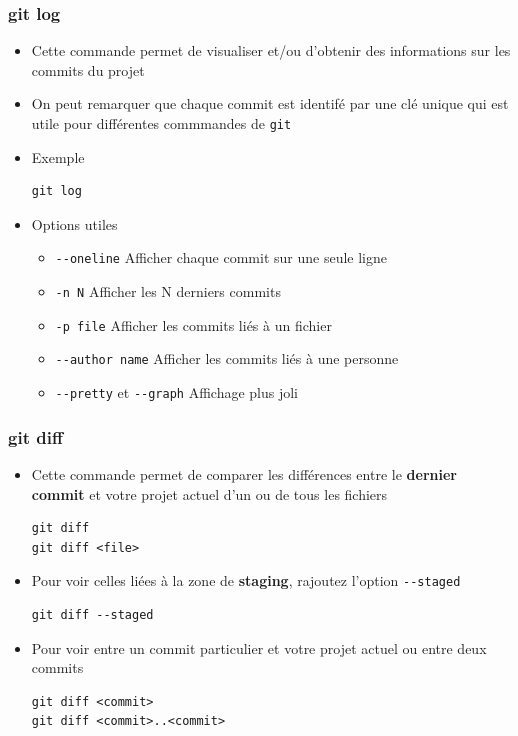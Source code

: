 \documentclass{beamer}
\begin{document}
\begin{frame}[fragile]
\frametitle{git log}

\begin{itemize}
\item Cette commande permet de visualiser et/ou d'obtenir des informations sur les commits du projet
\item On peut remarquer que chaque commit est identifé par une clé unique qui est utile pour différentes commmandes de \texttt{git}
\item Exemple
\begin{lstlisting}
git log
\end{lstlisting}
\item Options utiles
	\begin{itemize}
		\item \lstinline{--oneline} Afficher chaque commit sur une seule ligne
		\item \lstinline{-n N} Afficher les N derniers commits 
		\item \lstinline{-p file} Afficher les commits liés à un fichier 
		\item \lstinline{--author name} Afficher les commits liés à une personne
		\item \lstinline{--pretty} et \lstinline{--graph} Affichage plus joli
	\end{itemize}
\end{itemize}
\end{frame}

\begin{frame}[fragile]
\frametitle{git diff}

\begin{itemize}
\item Cette commande permet de comparer les différences entre le \textbf{dernier commit} et votre projet actuel d'un ou de tous les fichiers
\begin{lstlisting}
git diff
git diff <file>
\end{lstlisting}

\item Pour voir celles liées à la zone de \textbf{staging}, rajoutez l'option \lstinline{--staged}
\begin{lstlisting}
git diff --staged
\end{lstlisting}

\item Pour voir entre un commit particulier et votre projet actuel ou entre deux commits
\begin{lstlisting}
git diff <commit>
git diff <commit>..<commit>
\end{lstlisting}
\end{itemize}
\end{frame}
\end{document}
